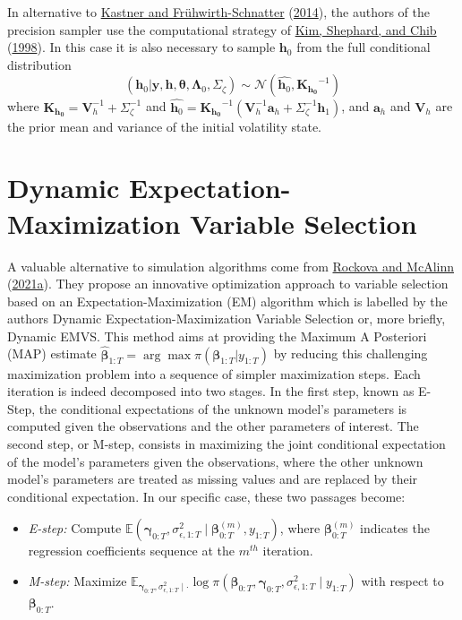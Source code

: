 \documentclass[
  12pt,
]{book}
\theoremstyle{break}
\theoremstyle{nonumberplain}
\begin{document}
In alternative to \protect\hyperlink{ref-KASTNER2014408}{Kastner and
Frühwirth-Schnatter} (\protect\hyperlink{ref-KASTNER2014408}{2014}), the
authors of the precision sampler use the computational strategy of
\protect\hyperlink{ref-KSC_1998}{Kim, Shephard, and Chib}
(\protect\hyperlink{ref-KSC_1998}{1998}). In this case it is also
necessary to sample \(\boldsymbol{h}_{0}\) from the full conditional
distribution \[
(\boldsymbol{h}_{0}|\boldsymbol{y},\boldsymbol{h},\boldsymbol{\theta},\boldsymbol{\Lambda}_{0},\Sigma_{\zeta})\sim\mathcal{N}(\hat{\boldsymbol{h}_{0}},\boldsymbol{K_{h_{0}}}^{-1})
\] where
\(\boldsymbol{K_{h_{0}}}=\boldsymbol{V}^{-1}_{h}+\Sigma_{\zeta}^{-1}\)
and
\(\hat{\boldsymbol{h}_{0}}=\boldsymbol{K_{h_{0}}}^{-1}(\boldsymbol{V}^{-1}_{h}\boldsymbol{a}_h+\Sigma_{\zeta}^{-1}\boldsymbol{h}_{1})\),
and \(\boldsymbol{a}_{h}\) and \(\boldsymbol{V}_{h}\) are the prior mean
and variance of the initial volatility state.

\section{Dynamic Expectation-Maximization Variable Selection}\label{Dynamic EMVS}

A valuable alternative to simulation algorithms come from
\protect\hyperlink{ref-rockova_mcalinn_2021}{Rockova and McAlinn}
(\protect\hyperlink{ref-rockova_mcalinn_2021}{2021a}). They propose an
innovative optimization approach to variable selection based on an
Expectation-Maximization (EM) algorithm which is labelled by the authors
Dynamic Expectation-Maximization Variable Selection or, more briefly,
Dynamic EMVS. This method aims at providing the Maximum A Posteriori
(MAP) estimate
\(\boldsymbol{\hat{\beta}}_{1:T}=\arg\max\pi(\boldsymbol{\beta}_{1:T}|y_{1:T})\)
by reducing this challenging maximization problem into a sequence of
simpler maximization steps. Each iteration is indeed decomposed into two
stages. In the first step, known as E-Step, the conditional expectations
of the unknown model's parameters is computed given the observations and
the other parameters of interest. The second step, or M-step, consists
in maximizing the joint conditional expectation of the model's
parameters given the observations, where the other unknown model's
parameters are treated as missing values and are replaced by their
conditional expectation. In our specific case, these two passages
become:

\begin{center}
\begin{itemize}
\item \emph{E-step:} Compute $\mathbb E(\boldsymbol{\gamma}_{0:T},\sigma^2_{\epsilon,1:T}\mid \boldsymbol{\beta}^{(m)}_{0:T},y_{1:T})$, where $\boldsymbol{\beta}_{0:T}^{(m)}$ indicates the regression coefficients sequence at the $m^{th}$ iteration.
\item \emph{M-step:} Maximize $\mathbb E_{\boldsymbol{\gamma}_{0:T},\sigma^2_{\epsilon,1:T} \mid \cdot }\log\pi(\boldsymbol{\beta}_{0:T},\boldsymbol{\gamma}_{0:T},\sigma^{2}_{\epsilon,1:T}\mid y_{1:T})$ with respect to $\boldsymbol{\beta}_{0:T}$.
\end{itemize}
\end{center}
\end{document}
